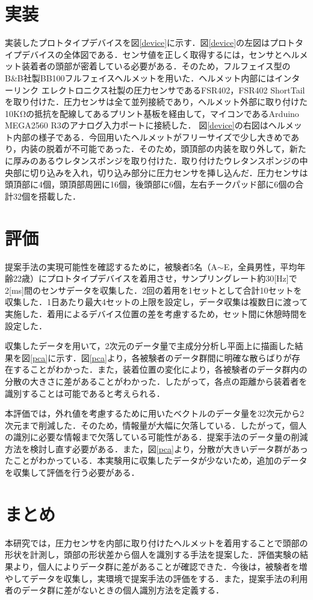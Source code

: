 \documentclass[Japanese,noauthor]{dicomopapers}
\begin{document}
\section{実装}
実装したプロトタイプデバイスを図\ref{device}に示す．図\ref{device}の左図はプロトタイプデバイスの全体図である．センサ値を正しく取得するには，センサとヘルメット装着者の頭部が密着している必要がある．そのため，フルフェイス型のB\&B社製BB100フルフェイスヘルメットを用いた．ヘルメット内部にはインターリンク エレクトロニクス社製の圧力センサであるFSR402，FSR402 ShortTailを取り付けた．圧力センサは全て並列接続であり，ヘルメット外部に取り付けた10KΩの抵抗を配線してあるプリント基板を経由して，マイコンであるArduino MEGA2560 R3のアナログ入力ポートに接続した．
図\ref{device}の右図はヘルメット内部の様子である．今回用いたヘルメットがフリーサイズで少し大きめであり，内装の脱着が不可能であった．そのため，頭頂部の内装を取り外して，新たに厚みのあるウレタンスポンジを取り付けた．取り付けたウレタンスポンジの中央部に切り込みを入れ，切り込み部分に圧力センサを挿し込んだ．圧力センサは頭頂部に4個，頭頂部周囲に16個，後頭部に6個，左右チークパッド部に6個の合計32個を搭載した．

\section{評価}
提案手法の実現可能性を確認するために，被験者5名（A$\sim$E，全員男性，平均年齢22歳）にプロトタイプデバイスを着用させ，サンプリングレート約30[Hz]で2[ms]間のセンサデータを収集した．2回の着用を1セットとして合計10セットを収集した．1日あたり最大4セットの上限を設定し，データ収集は複数日に渡って実施した．着用によるデバイス位置の差を考慮するため，セット間に休憩時間を設定した．\par
収集したデータを用いて，2次元のデータ量で主成分分析し平面上に描画した結果を図\ref{pca}に示す．図\ref{pca}より，各被験者のデータ群間に明確な散らばりが存在することがわかった．また，装着位置の変化により，各被験者のデータ群内の分散の大きさに差があることがわかった．したがって，各点の距離から装着者を識別することは可能であると考えられる．\par
本評価では，外れ値を考慮するために用いたベクトルのデータ量を32次元から2次元まで削減した．そのため，情報量が大幅に欠落している．したがって，個人の識別に必要な情報まで欠落している可能性がある．提案手法のデータ量の削減方法を検討し直す必要がある．また，図\ref{pca}より，分散が大きいデータ群があったことがわかっている．本実験用に収集したデータが少ないため，追加のデータを収集して評価を行う必要がある．

\section{まとめ}
本研究では，圧力センサを内部に取り付けたヘルメットを着用することで頭部の形状を計測し，頭部の形状差から個人を識別する手法を提案した．評価実験の結果より，個人によりデータ群に差があることが確認できた．今後は，被験者を増やしてデータを収集し，実環境で提案手法の評価をする．また，提案手法の利用者のデータ群に差がないときの個人識別方法を定義する．
\end{document}

